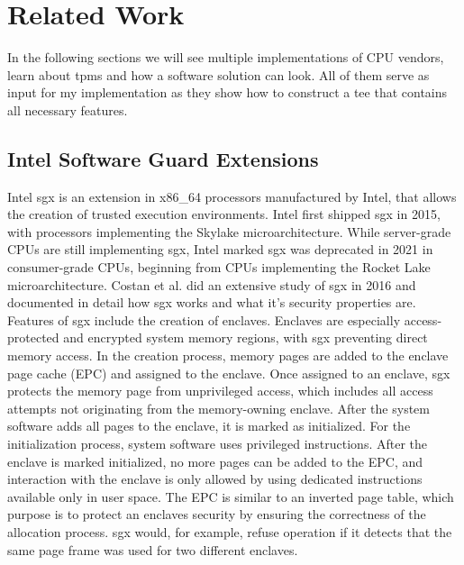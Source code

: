 \chapter{Related Work}
\label{chap:related}

In the following sections we will see multiple implementations of CPU vendors,
learn about \glspl{tpm} and how a software solution can look. All of them serve
as input for my implementation as they show how to construct a \gls{tee} that
contains all necessary features.

\section{Intel Software Guard Extensions}
\label{sec:20:sgx}
Intel \gls{sgx} is an extension in x86\_64 processors manufactured by Intel,
that allows the creation of trusted execution environments. Intel first shipped
\gls{sgx} in 2015, with processors implementing the Skylake microarchitecture.
While server-grade CPUs are still implementing \gls{sgx}, Intel marked \gls{sgx}
was deprecated in 2021 in consumer-grade CPUs, beginning from CPUs implementing
the Rocket Lake microarchitecture. Costan et al. did an extensive study of
\gls{sgx} in 2016 and documented in detail how \gls{sgx} works and what it's
security properties are.\cite{costan2016intel} \\

Features of \gls{sgx} include the creation of enclaves. Enclaves are especially
access-protected and encrypted system memory regions, with \gls{sgx} preventing
direct memory access. In the creation process, memory pages are added to the
enclave page cache (EPC) and assigned to the enclave. Once assigned to an
enclave, \gls{sgx} protects the memory page from unprivileged access, which
includes all access attempts not originating from the memory-owning enclave.
After the system software adds all pages to the enclave, it is marked as
initialized. For the initialization process, system software uses privileged
instructions. After the enclave is marked initialized, no more pages can be
added to the EPC, and interaction with the enclave is only allowed by using
dedicated instructions available only in user space. The EPC is similar to an
inverted page table, which purpose is to protect an enclaves security by
ensuring the correctness of the allocation process. \gls{sgx} would, for
example, refuse operation if it detects that the same page frame was used for
two different enclaves.\\

